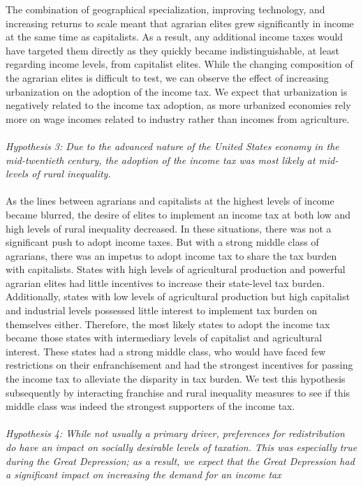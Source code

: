 \documentclass[letter, 12pt]{article}
\begin{document}
The combination of geographical specialization, improving technology, and increasing returns to scale meant that agrarian elites grew significantly in income at the same time as capitalists. As a result, any additional income taxes would have targeted them directly as they quickly became indistinguishable, at least regarding income levels, from capitalist elites. While the changing composition of the agrarian elites is difficult to test, we can observe the effect of increasing urbanization on the adoption of the income tax. We expect that urbanization is negatively related to the income tax adoption, as more urbanized economies rely more on wage incomes related to industry rather than incomes from agriculture.
\\
\\
\emph{Hypothesis 3: Due to the advanced nature of the United States economy in the mid-twentieth century, the adoption of the income tax was most likely at mid-levels of rural inequality.}
\\
\\
As the lines between agrarians and capitalists at the highest levels of income became blurred, the desire of elites to implement an income tax at both low and high levels of rural inequality decreased. In these situations, there was not a significant push to adopt income taxes. But with a strong middle class of agrarians, there was an impetus to adopt income tax to share the tax burden with capitalists. States with high levels of agricultural production and powerful agrarian elites had little incentives to increase their state-level tax burden. Additionally, states with low levels of agricultural production but high capitalist and industrial levels possessed little interest to implement tax burden on themselves either. Therefore, the most likely states to adopt the income tax became those states with intermediary levels of capitalist and agricultural interest. These states had a strong middle class, who would have faced few restrictions on their enfranchisement and had the strongest incentives for passing the income tax to alleviate the disparity in tax burden. We test this hypothesis subsequently by interacting franchise and rural inequality measures to see if this middle class was indeed the strongest supporters of the income tax.
\\
\\
\emph{Hypothesis 4: While not usually a primary driver, preferences for redistribution do have an impact on socially desirable levels of taxation. This was especially true during the Great Depression; as a result, we expect that the Great Depression had a significant impact on increasing the demand for an income tax}
\end{document}
